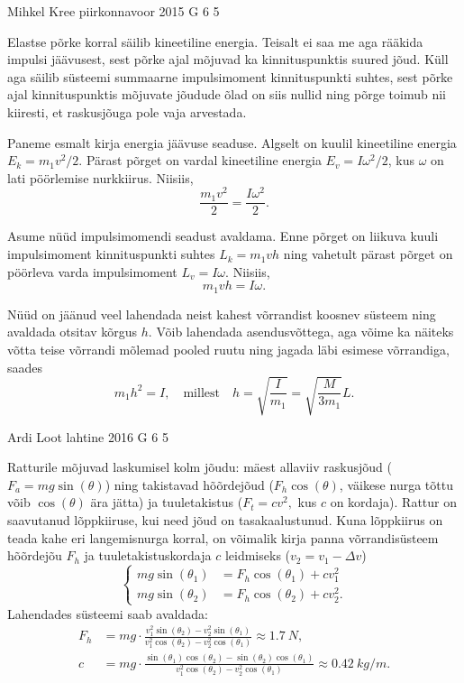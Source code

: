 \documentclass[11pt, twoside]{article}
\begin{document}
{%
{Mihkel Kree} %
{piirkonnavoor} %
{2015} %
{G 6} %
{5} %
{

\ifSolution
Elastse põrke korral säilib kineetiline energia. Teisalt ei saa me aga rääkida impulsi jäävusest, sest põrke ajal mõjuvad ka kinnituspunktis suured jõud. Küll aga säilib süsteemi summaarne impulsimoment kinnituspunkti suhtes, sest põrke ajal kinnituspunktis mõjuvate jõudude õlad on siis nullid ning põrge toimub nii kiiresti, et raskusjõuga pole vaja arvestada.

Paneme esmalt kirja energia jäävuse seaduse. Algselt on kuulil kineetiline energia $E_k=m_1v^2/2$. Pärast põrget on vardal kineetiline energia $E_v=I\omega^2/2$, kus $\omega$ on lati pöörlemise nurkkiirus. Niisiis,
\[
\frac{m_1v^2}{2}=\frac{I\omega^2}{2}.
\]

Asume nüüd impulsimomendi seadust avaldama. Enne põrget on liikuva kuuli impulsimoment kinnituspunkti suhtes $L_k=m_1vh$ ning vahetult pärast põrget on pöörleva varda impulsimoment $L_v=I\omega$. Niisiis,
\[
m_1vh=I\omega.
\]

Nüüd on jäänud veel lahendada neist kahest võrrandist koosnev süsteem ning avaldada otsitav kõrgus $h$. Võib lahendada asendusvõttega, aga võime ka näiteks võtta teise võrrandi mõlemad pooled ruutu ning jagada läbi esimese võrrandiga, saades
\[
m_1h^2 = I,\quad \text{millest} \quad h = \sqrt{\frac{I}{m_1}}=\sqrt{\frac{M}{3m_1}}L.
\]
\fi
}

{Ardi Loot} %
{lahtine} %
{2016} %
{G 6} %
{5} %
{

\ifSolution
Ratturile mõjuvad laskumisel kolm jõudu: mäest allaviiv raskusjõud
($F_{a}=mg\sin(\theta)$) ning takistavad hõõrdejõud ($F_{h}\cos(\theta)$, väikese nurga tõttu võib $\cos(\theta)$ ära jätta)
ja tuuletakistus ($F_{t}=cv^{2},$ kus $c$ on kordaja). Rattur on
saavutanud lõppkiiruse, kui need jõud on tasakaalustunud. Kuna lõppkiirus
on teada kahe eri langemisnurga korral, on võimalik kirja panna võrrandisüsteem
hõõrdejõu $F_{h}$ ja tuuletakistuskordaja $c$ leidmiseks ($v_{2}=v_{1}-\Delta v$) 
\[
\begin{cases}
mg\sin(\theta_{1})&=F_{h}\cos(\theta_1)+cv_{1}^{2}\\
mg\sin(\theta_{2})&=F_{h}\cos(\theta_2)+cv_{2}^{2}.
\end{cases}
\]
Lahendades süsteemi saab avaldada:
\begin{align*}
F_{h} & = mg\cdot\frac{v_{1}^{2}\sin(\theta_{2})-v_{2}^{2}\sin(\theta_{1})}{v_{1}^{2}\cos(\theta_2)-v_{2}^{2}\cos(\theta_1)}\approx\SI{1.7}{N},\\[7pt] 
c & = mg\cdot\frac{\sin(\theta_{1})\cos(\theta_2)-\sin(\theta_{2})\cos(\theta_1)}{v_{1}^{2}\cos(\theta_2)-v_{2}^{2}\cos(\theta_1)}\approx\SI{0.42}{kg/m}.
\end{align*}

}}
\end{document}
